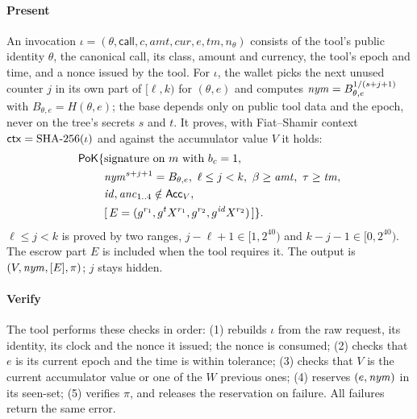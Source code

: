 \paragraph*{Present} An invocation $\iota=(\theta,\mathsf{call},c,\mathit{amt},\mathit{cur},e,\mathit{tm},n_\theta)$ consists of the tool's public identity $\theta$, the canonical call, its class, amount and currency, the tool's epoch and time, and a nonce issued by the tool. For $\iota$, the wallet picks the next unused counter $j$ in its own part of $[\ell,k)$ for $(\theta,e)$ and computes $\mathit{nym}=B_{\theta,e}^{1/(s+j+1)}$ with $B_{\theta,e}=H(\theta,e)$; the base depends only on public tool data and the epoch, never on the tree's secrets $s$ and $t$. It proves, with Fiat--Shamir context $\mathsf{ctx}=\mathrm{SHA\mbox{-}256}(\iota)$ and against the accumulator value $V$ it holds:
\begin{align*}
\mathsf{PoK}\{&\text{signature on } m \text{ with } b_c=1,\\
&\nym^{s+j+1}=B_{\theta,e},\ \ell\le j<k,\ \beta\ge\mathit{amt},\ \tau\ge \mathit{tm},\\
&\mathit{id},\mathit{anc}_{1..4}\notin\mathsf{Acc}_V,\\
&[\,E=(g^{r_1},g^{t}X^{r_1},g^{r_2},g^{\mathit{id}}X^{r_2})\,]\}.
\end{align*}
$\ell\le j<k$ is proved by two ranges, $j-\ell+1\in[1,2^{40})$ and $k-j-1\in[0,2^{40})$. The escrow part $E$ is included when the tool requires it. The output is $(V,\mathit{nym},[E],\pi)$; $j$ stays hidden.

\paragraph*{Verify} The tool performs these checks in order:
(1) rebuilds $\iota$ from the raw request, its identity, its clock and the nonce it issued; the nonce is consumed; (2) checks that $e$ is its current epoch and the time is within tolerance; (3) checks that $V$ is the current accumulator value or one of the $W$ previous ones; (4) reserves $(e,\mathit{nym})$ in its seen-set; (5) verifies $\pi$, and releases the reservation on failure.
All failures return the same error.

